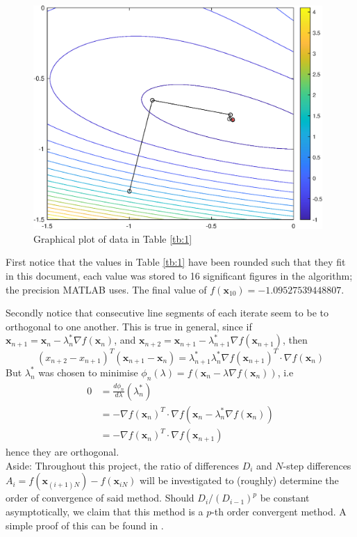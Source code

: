\documentclass[10pt,a4paper,notitlepage]{article}
\newcommand{\x}{\mathbf{x}}
\begin{document}
\begin{figure}[H]
\centering
\includegraphics[width=11cm]{Image_3}
\caption{Graphical plot of data in Table \ref{tb:1}}\label{fg:3}
\end{figure}
First notice that the values in Table \ref{tb:1} have been rounded such that they fit in this document, each value was stored to 16 significant figures in the algorithm; the precision MATLAB uses. The final value of $f(\x_{10})=-1.09527539448807$.\par
Secondly notice that consecutive line segments of each iterate seem to be to orthogonal to one another. This is true in general, since if $\x_{n+1}=\x_{n}-\lambda_{n}^{*}\nabla f(\x_{n})$, and $\x_{n+2}=\x_{n+1}-\lambda_{n+1}^{*}\nabla f(\x_{n+1})$, then 
\begin{equation}
\left(x_{n+2}-x_{n+1}\right)^{T}\left(\x_{n+1}-\x_{n}\right)=\lambda_{n+1}^{*}\lambda_{n}^{*}\nabla f(\x_{n+1})^{T}\cdot\nabla f(\x_{n})
\end{equation}
But $\lambda_{n}^{*}$ was chosen to minimise $\phi_{n}(\lambda)=f(\x_{n}-\lambda \nabla f(\x_{n}))$, i.e 
\begin{equation}
\begin{aligned}
0 &= \frac{d\phi_{n}}{d\lambda}\left(\lambda_{n}^{*}\right)\\
&= -\nabla f(\x_{n})^{T}\cdot \nabla f\left(\x_{n}-\lambda_{n}^{*}\nabla f(\x_{n})\right)\\
&= -\nabla f(\x_{n})^{T}\cdot \nabla f(\x_{n+1})
\end{aligned}
\end{equation}
hence they are orthogonal.\\

Aside: Throughout this project, the ratio of differences $D_{i}$ and $N$-step differences $A_{i}=f(\x_{(i+1)N})-f(\x_{iN})$ will be investigated to (roughly) determine the order of convergence of said method. Should $D_{i}/(D_{i-1})^{p}$ be constant asymptotically, we claim that this method is a $p$-th order convergent method. A simple proof of this can be found in \cite{111}.\\
\end{document}
